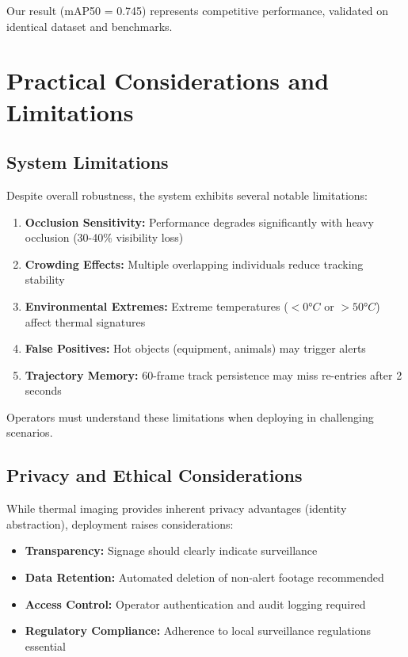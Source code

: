\documentclass[conference]{IEEEtran}
\begin{document}
Our result (mAP50 = 0.745) represents competitive performance, validated on identical dataset and benchmarks.

\section{Practical Considerations and Limitations}

\subsection{System Limitations}

Despite overall robustness, the system exhibits several notable limitations:

\begin{enumerate}
\item \textbf{Occlusion Sensitivity:} Performance degrades significantly with heavy occlusion (30-40\% visibility loss)
\item \textbf{Crowding Effects:} Multiple overlapping individuals reduce tracking stability
\item \textbf{Environmental Extremes:} Extreme temperatures ($< 0°C$ or $> 50°C$) affect thermal signatures
\item \textbf{False Positives:} Hot objects (equipment, animals) may trigger alerts
\item \textbf{Trajectory Memory:} 60-frame track persistence may miss re-entries after 2 seconds
\end{enumerate}

Operators must understand these limitations when deploying in challenging scenarios.

\subsection{Privacy and Ethical Considerations}

While thermal imaging provides inherent privacy advantages (identity abstraction), deployment raises considerations:

\begin{itemize}
\item \textbf{Transparency:} Signage should clearly indicate surveillance
\item \textbf{Data Retention:} Automated deletion of non-alert footage recommended
\item \textbf{Access Control:} Operator authentication and audit logging required
\item \textbf{Regulatory Compliance:} Adherence to local surveillance regulations essential
\end{itemize}
\end{document}

